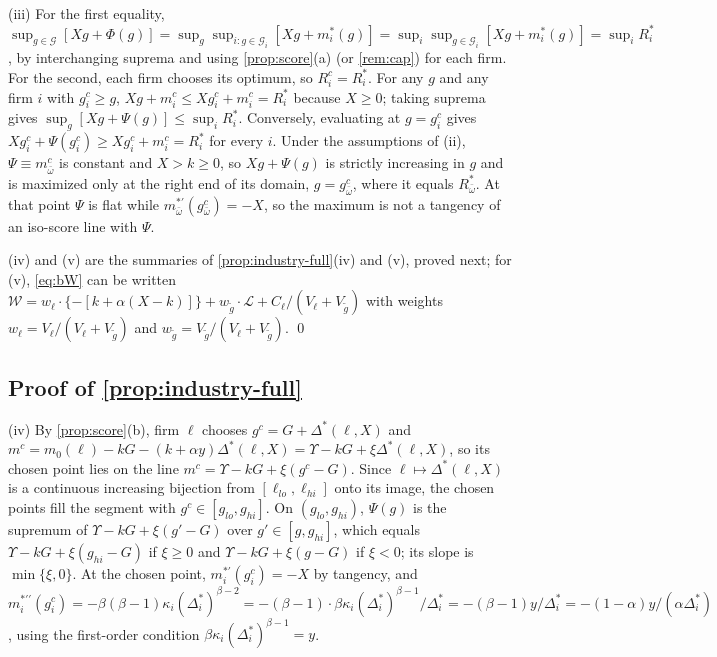 (iii) For the first equality, $\sup_{g\in\mathcal G}[Xg+\Phi(g)]=\sup_g\sup_{i:g\in\mathcal G_i}[Xg+m_i^*(g)]=\sup_i\sup_{g\in\mathcal G_i}[Xg+m_i^*(g)]=\sup_iR_i^*$, by interchanging suprema and using \autoref{prop:score}(a) (or \autoref{rem:cap}) for each firm. For the second, each firm chooses its optimum, so $R_i^c=R_i^*$. For any $g$ and any firm $i$ with $g_i^c\ge g$, $Xg+m_i^c\le Xg_i^c+m_i^c=R_i^*$ because $X\ge 0$; taking suprema gives $\sup_g[Xg+\Psi(g)]\le\sup_iR_i^*$. Conversely, evaluating at $g=g_i^c$ gives $Xg_i^c+\Psi(g_i^c)\ge Xg_i^c+m_i^c=R_i^*$ for every $i$. Under the assumptions of (ii), $\Psi\equiv m_{\bar\omega}^c$ is constant and $X>k\ge 0$, so $Xg+\Psi(g)$ is strictly increasing in $g$ and is maximized only at the right end of its domain, $g=g_{\bar\omega}^c$, where it equals $R_{\bar\omega}^*$. At that point $\Psi$ is flat while $m_{\bar\omega}^{*\prime}(g_{\bar\omega}^c)=-X$, so the maximum is not a tangency of an iso-score line with $\Psi$.

(iv) and (v) are the summaries of \autoref{prop:industry-full}(iv) and (v), proved next; for (v), \eqref{eq:bW} can be written $\mathcal W=w_\ell\cdot\{-[k+\alpha(X-k)]\}+w_{\tilde g}\cdot\mathcal L+C_\ell/(V_\ell+V_{\tilde g})$ with weights $w_\ell=V_\ell/(V_\ell+V_{\tilde g})$ and $w_{\tilde g}=V_{\tilde g}/(V_\ell+V_{\tilde g})$. \qed

\subsection*{Proof of \autoref{prop:industry-full}}

(iv) By \autoref{prop:score}(b), firm $\ell$ chooses $g^c=G+\Delta^*(\ell,X)$ and $m^c=m_0(\ell)-kG-(k+\alpha y)\Delta^*(\ell,X)=\Upsilon-kG+\xi\Delta^*(\ell,X)$, so its chosen point lies on the line $m^c=\Upsilon-kG+\xi(g^c-G)$. Since $\ell\mapsto\Delta^*(\ell,X)$ is a continuous increasing bijection from $[\ell_{lo},\ell_{hi}]$ onto its image, the chosen points fill the segment with $g^c\in[g_{lo},g_{hi}]$. On $(g_{lo},g_{hi})$, $\Psi(g)$ is the supremum of $\Upsilon-kG+\xi(g'-G)$ over $g'\in[g,g_{hi}]$, which equals $\Upsilon-kG+\xi(g_{hi}-G)$ if $\xi\ge 0$ and $\Upsilon-kG+\xi(g-G)$ if $\xi<0$; its slope is $\min\{\xi,0\}$. At the chosen point, $m_i^{*\prime}(g_i^c)=-X$ by tangency, and $m_i^{*\prime\prime}(g_i^c)=-\beta(\beta-1)\kappa_i(\Delta_i^*)^{\beta-2}=-(\beta-1)\cdot\beta\kappa_i(\Delta_i^*)^{\beta-1}/\Delta_i^*=-(\beta-1)y/\Delta_i^*=-(1-\alpha)y/(\alpha\Delta_i^*)$, using the first-order condition $\beta\kappa_i(\Delta_i^*)^{\beta-1}=y$.


